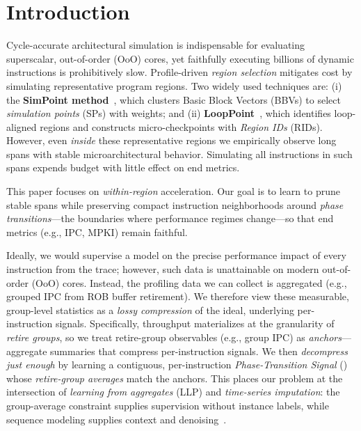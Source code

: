 \section{Introduction}
\label{sec:intro}

Cycle-accurate architectural simulation is indispensable for evaluating superscalar, out-of-order (OoO) cores, yet faithfully executing billions of dynamic instructions is prohibitively slow. Profile-driven \emph{region selection} mitigates cost by simulating representative program regions. Two widely used techniques are: (i) the \textbf{SimPoint method}~\cite{simpoint-asplos02,simpoint03,simpoint-howto}, which clusters Basic Block Vectors (BBVs) to select \emph{simulation points} (SPs) with weights; and (ii) \textbf{LoopPoint}~\cite{looppoint}, which identifies loop-aligned regions and constructs micro-checkpoints with \emph{Region IDs} (RIDs). However, even \emph{inside} these representative regions we empirically observe long spans with stable microarchitectural behavior. Simulating all instructions in such spans expends budget with little effect on end metrics.

This paper focuses on \emph{within-region} acceleration. Our  goal is to learn to prune stable spans while preserving compact instruction neighborhoods around \emph{phase transitions}—the boundaries where performance regimes change—so that end metrics (e.g., IPC, MPKI) remain faithful.

Ideally, we would supervise a model on the precise performance impact of every instruction from the trace; however, such data is unattainable on modern out-of-order (OoO) cores. Instead, the profiling data we can collect is aggregated (e.g., grouped IPC from ROB buffer retirement). We therefore view these measurable, group-level statistics as a \emph{lossy compression} of the ideal, underlying per-instruction signals. Specifically, throughput materializes at the granularity of \emph{retire groups}, so we treat retire-group observables (e.g., group IPC) as \emph{anchors}—aggregate summaries that compress per-instruction signals. We then \emph{decompress just enough} by learning a contiguous, per-instruction \emph{Phase-Transition Signal} (\pts) whose \emph{retire-group averages} match the anchors. This places our problem at the intersection of \emph{learning from aggregates} (LLP) and \emph{time-series imputation}: the group-average constraint supplies supervision without instance labels, while sequence modeling supplies context and denoising~\cite{yu2014-llp,scott2020-llp,law2018-agg,zhang2020-agg}.

